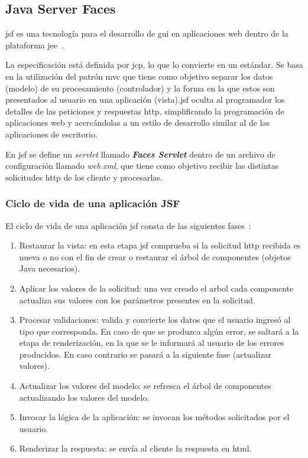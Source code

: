 \subsection{Java Server Faces}
\label{sec:jsf}
\acrfull{jsf} es una tecnología para el desarrollo de \acrshort{gui} en aplicaciones web dentro de la plataforma \acrshort{jee}~\cite{DesarrolloJakartaEE}.

La especificación está definida por \acrfull{jcp}, lo que lo convierte en un estándar. Se basa en la utilización del patrón  \acrfull{mvc} que tiene como objetivo separar los datos (modelo) de su procesamiento (controlador) y la forma en la que estos son presentados al usuario en una aplicación (vista).\acrshort{jsf} oculta al programador los detalles de las peticiones y respuestas \acrshort{http}, simplificando la programación de aplicaciones web y acercándolas a un estilo de desarrollo similar al de las aplicaciones de escritorio.

En \acrshort{jsf} se define un \emph{servlet} llamado \emph{\textbf{Faces Servlet}} dentro de un archivo de configuración llamado \emph{web.xml}, que tiene como objetivo recibir las distintas solicitudes \acrshort{http} de los cliente y procesarlas. 

\subsubsection{Ciclo de vida de una aplicación JSF}
\label{sec:ciclo-vida-jsf}
El ciclo de vida de una aplicación \acrshort{jsf} consta de las siguientes fases~\cite{DesarrolloJakartaEE}:
\begin{enumerate}
\item Restaurar la vista: en esta etapa \acrshort{jsf} comprueba si la solicitud \acrshort{http} recibida es nueva o no con el fin de crear o restaurar el árbol de componentes (objetos Java necesarios).
\item Aplicar los valores de la solicitud: una vez creado el arbol cada componente actualiza sus valores con los parámetros presentes en la solicitud.
\item Procesar validaciones: valida y convierte los datos que el usuario ingresó al tipo que corresponda. En caso de que se produzca algún error, se saltará a la etapa de renderización, en la que se le informará al usuario de los errores producidos. En caso contrario se pasará a la siguiente fase (actualizar valores).
\item Actualizar los valores del modelo: se refresca el árbol de componentes actualizando los valores del modelo.
\item Invocar la lógica de la aplicación: se invocan los métodos solicitados por el usuario.
\item Renderizar la respuesta: se envía al cliente la respuesta en \acrshort{html}.
\end{enumerate}


